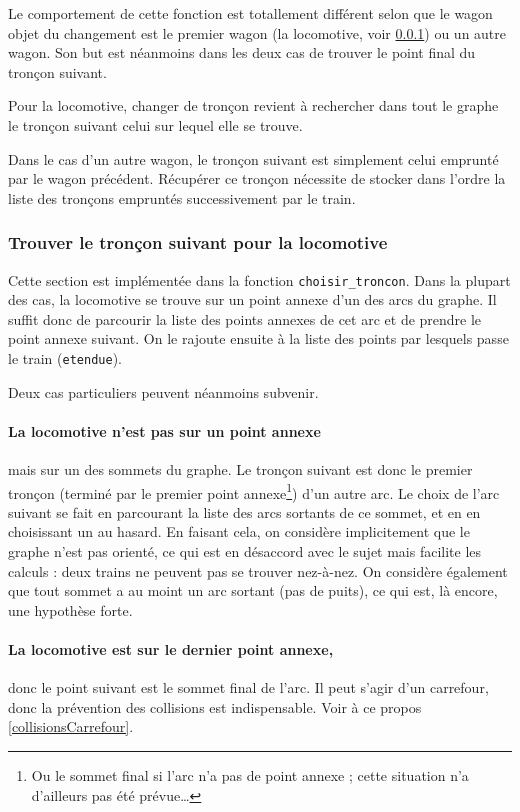 \documentclass[a4paper, oneside, 11pt, twocolumn]{article}
\begin{document}
Le comportement de cette fonction est totallement différent selon que le wagon objet du changement est le premier wagon (la locomotive, voir \ref{choisirTroncon}) ou un autre wagon. Son but est néanmoins dans les deux cas de trouver le point final du tronçon suivant.

Pour la locomotive, changer de tronçon revient à rechercher dans tout le graphe le tronçon suivant celui sur lequel elle se trouve.

Dans le cas d'un autre wagon, le tronçon suivant est simplement celui emprunté par le wagon précédent. Récupérer ce tronçon nécessite de stocker dans l'ordre la liste des tronçons empruntés successivement par le train.

\subsubsection[Choisir un tronçon]{Trouver le tronçon suivant pour la locomotive}
\label{choisirTroncon}

Cette section est implémentée dans la fonction \texttt{choisir\_troncon}. Dans la plupart des cas, la locomotive se trouve sur un point annexe d'un des arcs du graphe. Il suffit donc de parcourir la liste des points annexes de cet arc et de prendre le point annexe suivant. On le rajoute ensuite à la liste des points par lesquels passe le train (\texttt{etendue}).

Deux cas particuliers peuvent néanmoins subvenir.

\paragraph{La locomotive n'est pas sur un point annexe} mais sur un des sommets du graphe. Le tronçon suivant est donc le premier tronçon (terminé par le premier point annexe\footnote{Ou le sommet final si l'arc n'a pas de point annexe ; cette situation n'a d'ailleurs pas été prévue\dots}) d'un autre arc. Le choix de l'arc suivant se fait en parcourant la liste des arcs sortants de ce sommet, et en en choisissant un au hasard. En faisant cela, on considère implicitement que le graphe n'est pas orienté, ce qui est en désaccord avec le sujet mais facilite les calculs : deux trains ne peuvent pas se trouver nez-à-nez. On considère également que tout sommet a au moint un arc sortant (pas de puits), ce qui est, là encore, une hypothèse forte.

\paragraph{La locomotive est sur le dernier point annexe,} donc le point suivant est le sommet final de l'arc. Il peut s'agir d'un carrefour, donc la prévention des collisions est indispensable. Voir à ce propos \ref{collisionsCarrefour}.
\end{document}
